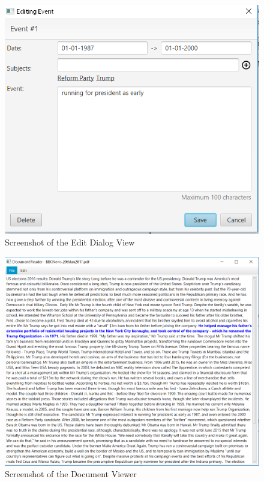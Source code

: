 \begin{figure}[h]
\caption{Screenshot of the Edit Dialog View}
\label{fig:editDialogImplemented}
\includegraphics[width=\linewidth]{editDialogImplemented.png}
\centering
\end{figure}
\begin{figure}[h]
\caption{Screenshot of the Document Viewer}
\label{fig:viewDocImplemented}
\includegraphics[width=\linewidth]{viewDocImplemented.png}
\centering
\end{figure}
